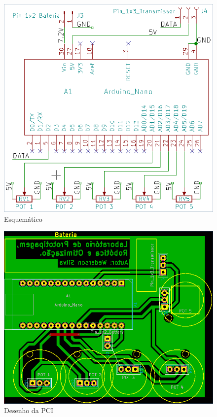 \documentclass{ufpatcc}
\begin{document}
		\begin{figure}[h!]
  		\label{fig:schematic-glove-module1}
			\centering
  		\includegraphics[scale=0.5]{../pictures/schematic-glove-module1.png}
			\caption{Esquemático}
		\end{figure}

		\begin{figure}[h!]
  		\label{fig:PCB-glove-module1}
			\centering
  		\includegraphics[scale=0.5]{../pictures/PCB-glove-module1.png}
			\caption{Desenho da PCI}
		\end{figure}
\end{document}

